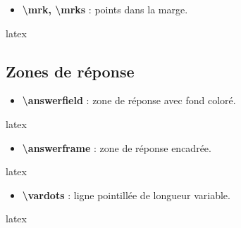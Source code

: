 \documentclass[
    french,
    margin=2cm
]{neoschool}
\begin{document}
\begin{itemize}

\item \textbf{\textbackslash mrk, \textbackslash mrks} : points dans la
  marge.
\end{itemize}

\begin{code}{latex}

\end{code}

\subsection{Zones de réponse}

\begin{itemize}
\item
  \textbf{\textbackslash answerfield} : zone de réponse avec fond coloré.
\end{itemize}

\begin{code}{latex}

\end{code}

\begin{itemize}
\item
  \textbf{\textbackslash answerframe} : zone de réponse encadrée.
\end{itemize}

\begin{code}{latex}

\end{code}

\begin{itemize}
\item
  \textbf{\textbackslash vardots} : ligne pointillée de longueur
  variable.
\end{itemize}

\begin{code}{latex}
\vardots

\vardots[5cm]
\end{code}
\end{document}
